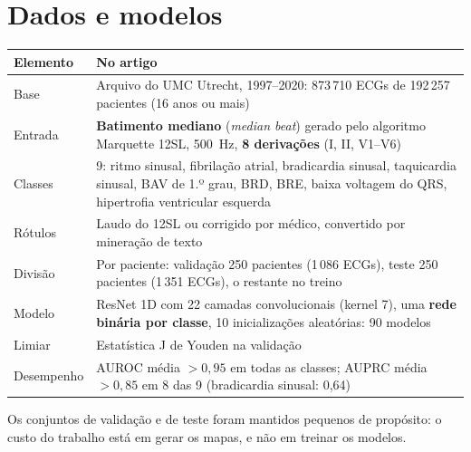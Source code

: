 \documentclass[11pt,a4paper]{article}
\begin{document}
\section{Dados e modelos}
\begin{center}\small
\begin{tabularx}{\linewidth}{lX}
\toprule
\textbf{Elemento} & \textbf{No artigo} \\
\midrule
Base & Arquivo do UMC Utrecht, 1997--2020: 873\,710 ECGs de 192\,257 pacientes (16 anos ou mais) \\
Entrada & \textbf{Batimento mediano} (\textit{median beat}) gerado pelo algoritmo Marquette 12SL, 500~Hz, \textbf{8 derivações} (I, II, V1--V6) \\
Classes & 9: ritmo sinusal, fibrilação atrial, bradicardia sinusal, taquicardia sinusal, BAV de 1.º grau, BRD, BRE, baixa voltagem do QRS, hipertrofia ventricular esquerda \\
Rótulos & Laudo do 12SL ou corrigido por médico, convertido por mineração de texto \\
Divisão & Por paciente: validação 250 pacientes (1\,086 ECGs), teste 250 pacientes (1\,351 ECGs), o restante no treino \\
Modelo & ResNet 1D com 22 camadas convolucionais (kernel 7), uma \textbf{rede binária por classe}, 10 inicializações aleatórias: 90 modelos \\
Limiar & Estatística J de Youden na validação \\
Desempenho & AUROC média $> 0{,}95$ em todas as classes; AUPRC média $> 0{,}85$ em 8 das 9 (bradicardia sinusal: 0,64) \\
\bottomrule
\end{tabularx}
\end{center}
Os conjuntos de validação e de teste foram mantidos pequenos de propósito: o custo do trabalho está em gerar os mapas, e não em treinar os modelos.
\end{document}
